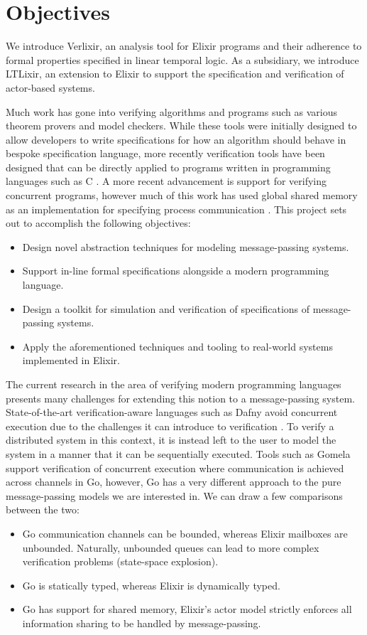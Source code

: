 \section{Objectives}
We introduce Verlixir, an analysis tool for Elixir programs and their adherence to formal properties specified in linear temporal logic. As a subsidiary, we introduce LTLixir, an extension to Elixir to support the specification and verification of actor-based systems. 
\par
Much work has gone into verifying algorithms and programs such as various theorem provers and model checkers. While these tools were initially designed to allow developers to write specifications for how an algorithm should behave in bespoke specification language, more recently verification tools have been designed that can be directly applied to programs written in programming languages such as C \cite{c_to_promela}. A more recent advancement is support for verifying concurrent programs, however much of this work has used global shared memory as an implementation for specifying process communication \cite{dafny_paper}. This project sets out to accomplish the following objectives:
\begin{itemize}
    \item Design novel abstraction techniques for modeling message-passing systems.
    \item Support in-line formal specifications alongside a modern programming language.
    \item Design a toolkit for simulation and verification of specifications of message-passing systems.
    \item Apply the aforementioned techniques and tooling to real-world systems implemented in Elixir.
\end{itemize}
The current research in the area of verifying modern programming languages presents many challenges for extending this notion to a message-passing system. State-of-the-art verification-aware languages such as Dafny avoid concurrent execution due to the challenges it can introduce to verification \cite{dafny_concurrency}. To verify a distributed system in this context, it is instead left to the user to model the system in a manner that it can be sequentially executed. Tools such as Gomela \cite{gomela} support verification of concurrent execution where communication is achieved across channels in Go, however, Go has a very different approach to the pure message-passing models we are interested in. We can draw a few comparisons between the two:
\begin{itemize}
    \item Go communication channels can be bounded, whereas Elixir mailboxes are unbounded. Naturally, unbounded queues can lead to more complex verification problems (state-space explosion).
    \item Go is statically typed, whereas Elixir is dynamically typed.
    \item Go has support for shared memory, Elixir's actor model strictly enforces all information sharing to be handled by message-passing.
\end{itemize}

